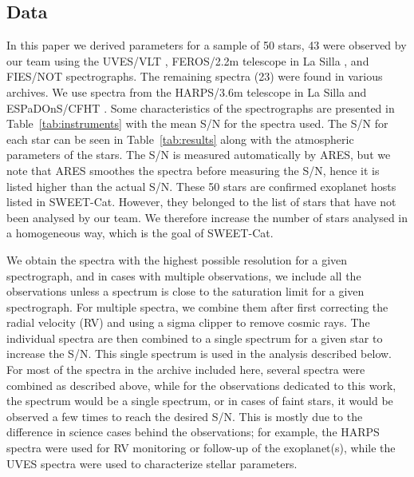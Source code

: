 \documentclass{aa}
\begin{document}
\subsection{Data}
\label{sec:data}
In this paper we derived parameters for a sample of 50 stars, 43 were observed
by our team using the UVES/VLT \citep{UVES}, FEROS/2.2m telescope in La Silla
\citep{FEROS}, and FIES/NOT \citep{FIES} spectrographs. The remaining spectra
(23) were found in various archives. We use spectra from the HARPS/3.6m
telescope in La Silla \citep{HARPS} and ESPaDOnS/CFHT \citep{ESPADONS}. Some
characteristics of the spectrographs are presented in
Table~\ref{tab:instruments} with the mean S/N for the spectra used. The S/N for
each star can be seen in Table~\ref{tab:results} along with the atmospheric
parameters of the stars. The S/N is measured automatically by ARES, but we note
that ARES smoothes the spectra before measuring the S/N, hence it is listed
higher than the actual S/N. These 50 stars are confirmed exoplanet hosts listed
in SWEET-Cat. However, they belonged to the list of stars that have not been
analysed by our team. We therefore increase the number of stars analysed in a
homogeneous way, which is the goal of SWEET-Cat.

We obtain the spectra with the highest possible resolution for a given
spectrograph, and in cases with multiple observations, we include all the
observations unless a spectrum is close to the saturation limit for a given
spectrograph. For multiple spectra, we combine them after first correcting the
radial velocity (RV) and using a sigma clipper to remove cosmic rays. The
individual spectra are then combined to a single spectrum for a given star to
increase the S/N. This single spectrum is used in the analysis described below.
For most of the spectra in the archive included here, several spectra were
combined as described above, while for the observations dedicated to this work,
the spectrum would be a single spectrum, or in cases of faint stars, it would be
observed a few times to reach the desired S/N. This is mostly due to the
difference in science cases behind the observations; for example,  the HARPS
spectra were used for RV monitoring or follow-up of the exoplanet(s), while the
UVES spectra were used to characterize stellar parameters.
\end{document}
